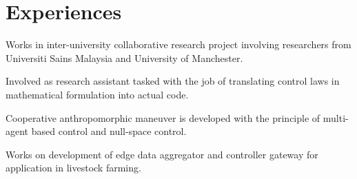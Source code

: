 \documentclass[letterpaper]{deedy-resume} %
\begin{document}
\hfill
%
%
\begin{minipage}[t]{0.66\textwidth} %


\section{Experiences}


\vspace{\topsep}
\begin{tightitemize}
\item Works in inter-university collaborative research project involving researchers from Universiti Sains Malaysia and University of Manchester.
\item Involved as research assistant tasked with the job of translating control laws in mathematical formulation into actual code.
\item Cooperative anthropomorphic maneuver is developed with the principle of multi-agent based control and null-space control.
\end{tightitemize}
\sectionspace

\vspace{\topsep}
\begin{tightitemize}
\item Works on development of edge data aggregator and controller gateway for application in livestock farming.
\end{tightitemize}
\sectionspace



\end{minipage}
\end{document}
